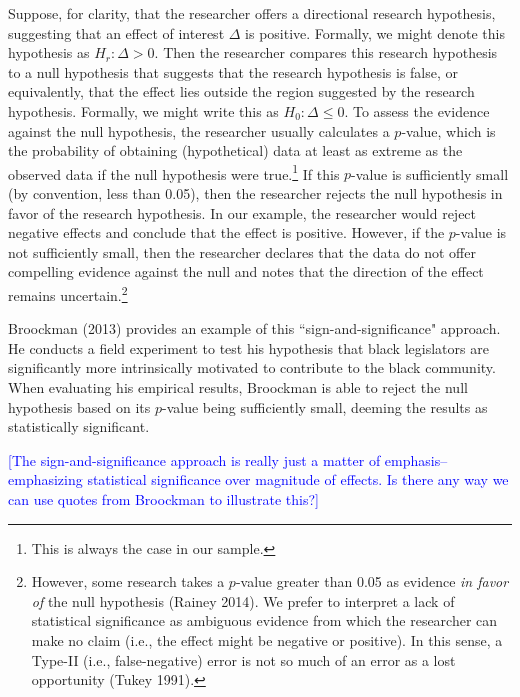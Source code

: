 \documentclass[12pt]{article}
\newcommand{\kelly}[1]{\textcolor{blue}{#1}}
\begin{document}
Suppose, for clarity, that the researcher offers a directional research hypothesis, suggesting that an effect of interest $\Delta$ is positive. Formally, we might denote this hypothesis as $H_r: \Delta > 0$. Then the researcher compares this research hypothesis to a null hypothesis that suggests that the research hypothesis is false, or equivalently, that the effect lies outside the region suggested by the research hypothesis. Formally, we might write this as $H_0: \Delta \leq 0$. To assess the evidence against the null hypothesis, the researcher usually calculates a $p$-value, which is the probability of obtaining (hypothetical) data at least as extreme as the observed data if the null hypothesis were true.\footnote{This is always the case in our sample.} If this $p$-value is sufficiently small (by convention, less than 0.05), then the researcher rejects the null hypothesis in favor of the research hypothesis. In our example, the researcher would reject negative effects and conclude that the effect is positive. However, if the $p$-value is not sufficiently small, then the researcher declares that the data do not offer compelling evidence against the null and notes that the direction of the effect remains uncertain.\footnote{However, some research takes a $p$-value greater than 0.05 as evidence \textit{in favor of} the null hypothesis (Rainey 2014). We prefer to interpret a lack of statistical significance as ambiguous evidence from which the researcher can make no claim (i.e., the effect might be negative or positive). In this sense, a Type-II (i.e., false-negative) error is not so much of an error as a lost opportunity (Tukey 1991).}

Broockman (2013) provides an example of this ``sign-and-significance" approach. He conducts a field experiment to test his hypothesis that black legislators are significantly more intrinsically motivated to contribute to the black community. When evaluating his empirical results, Broockman is able to reject the null hypothesis based on its $p$-value being sufficiently small, deeming the results as statistically significant. 

\kelly{[The sign-and-significance approach is really just a matter of emphasis--emphasizing statistical significance over magnitude of effects. Is there any way we can use quotes from Broockman to illustrate this?]}
\end{document}
